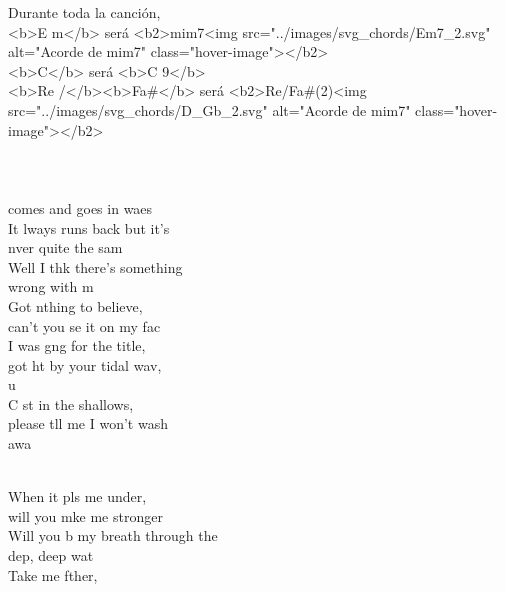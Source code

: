 \begin{cancion}%
Durante toda la canción, \\
<b>E m</b> será <b2>mim7<img src="../images/svg_chords/Em7_2.svg" alt="Acorde de mim7" class="hover-image"></b2>\\
<b>C</b>  será <b>C 9</b>\\
<b>Re /</b><b>Fa#</b> será <b2>Re/Fa#(2)<img src="../images/svg_chords/D_Gb_2.svg" alt="Acorde de mim7" class="hover-image"></b2>\\
	\jump\\
{}\vspace*{-0.4cm}\\
	           \\
	 comes and goes in waes\\
	It lways runs back but it's \\
	nver quite the sam\\
	Well I thk there's something \\
	wrong with m\\
	Got nthing to believe, \\
	can't you se it on my fac\\
	I was gng for the title, \\
	got ht by your tidal wav, \\
	u\\
	C st in the shallows, \\
	please tll me I won't wash\\
	 awa  \\\jump\\
	\begin{chorus}%
	When it pls me under, \\
	will you mke me stronger\\
	Will you b my breath through the \\
	dep, deep wat\\
	Take me fther, \\

\end{chorus}
\end{cancion}

